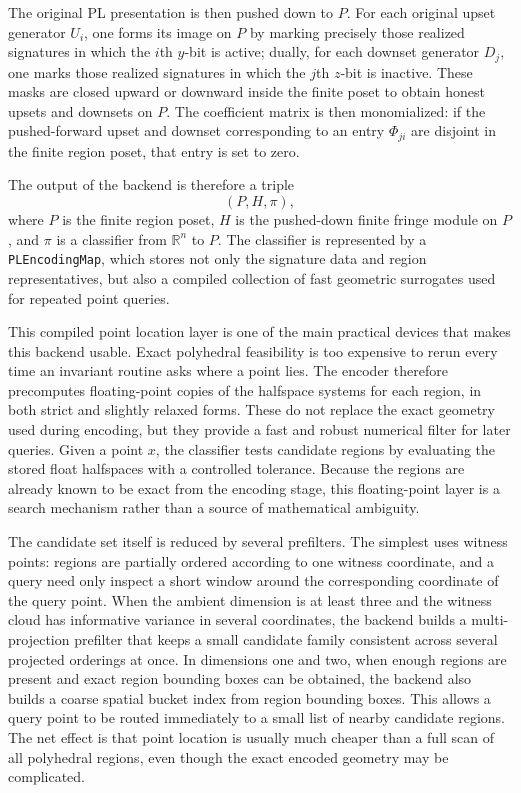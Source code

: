 \documentclass[11pt]{article}
\newcommand{\R}{\mathbb{R}}
\theoremstyle{definition}
\theoremstyle{remark}
\begin{document}
The original PL presentation is then pushed down to \(P\).  For each original upset generator \(U_i\), one forms its image on \(P\) by marking precisely those realized signatures in which the \(i\)th \(y\)-bit is active; dually, for each downset generator \(D_j\), one marks those realized signatures in which the \(j\)th \(z\)-bit is inactive.  These masks are closed upward or downward inside the finite poset to obtain honest upsets and downsets on \(P\).  The coefficient matrix is then monomialized: if the pushed-forward upset and downset corresponding to an entry \(\Phi_{ji}\) are disjoint in the finite region poset, that entry is set to zero.

The output of the backend is therefore a triple
\[
(P,H,\pi),
\]
where \(P\) is the finite region poset, \(H\) is the pushed-down finite fringe module on \(P\), and \(\pi\) is a classifier from \(\R^n\) to \(P\).  The classifier is represented by a \texttt{PLEncodingMap}, which stores not only the signature data and region representatives, but also a compiled collection of fast geometric surrogates used for repeated point queries.

This compiled point location layer is one of the main practical devices that makes this backend usable.  Exact polyhedral feasibility is too expensive to rerun every time an invariant routine asks where a point lies.  The encoder therefore precomputes floating-point copies of the halfspace systems for each region, in both strict and slightly relaxed forms.  These do not replace the exact geometry used during encoding, but they provide a fast and robust numerical filter for later queries.  Given a point \(x\), the classifier tests candidate regions by evaluating the stored float halfspaces with a controlled tolerance.  Because the regions are already known to be exact from the encoding stage, this floating-point layer is a search mechanism rather than a source of mathematical ambiguity.

The candidate set itself is reduced by several prefilters.  The simplest uses witness points: regions are partially ordered according to one witness coordinate, and a query need only inspect a short window around the corresponding coordinate of the query point.  When the ambient dimension is at least three and the witness cloud has informative variance in several coordinates, the backend builds a multi-projection prefilter that keeps a small candidate family consistent across several projected orderings at once.  In dimensions one and two, when enough regions are present and exact region bounding boxes can be obtained, the backend also builds a coarse spatial bucket index from region bounding boxes.  This allows a query point to be routed immediately to a small list of nearby candidate regions.  The net effect is that point location is usually much cheaper than a full scan of all polyhedral regions, even though the exact encoded geometry may be complicated.
\end{document}
